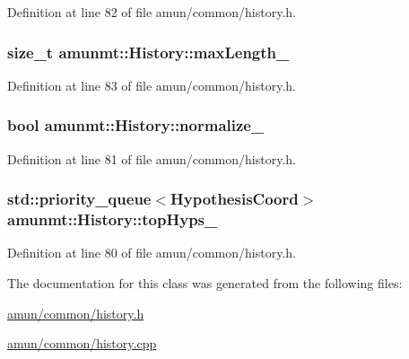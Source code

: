 Definition at line 82 of file amun/common/history.\+h.

\subsubsection[{\texorpdfstring{max\+Length\+\_\+}{maxLength_}}]{\setlength{\rightskip}{0pt plus 5cm}size\+\_\+t amunmt\+::\+History\+::max\+Length\+\_\+\hspace{0.3cm}{\ttfamily [private]}}\hypertarget{classamunmt_1_1History_af78aa04752c1920599f44628311c2eef}{}\label{classamunmt_1_1History_af78aa04752c1920599f44628311c2eef}


Definition at line 83 of file amun/common/history.\+h.

\subsubsection[{\texorpdfstring{normalize\+\_\+}{normalize_}}]{\setlength{\rightskip}{0pt plus 5cm}bool amunmt\+::\+History\+::normalize\+\_\+\hspace{0.3cm}{\ttfamily [private]}}\hypertarget{classamunmt_1_1History_ad43884859a97646dc7f1c8abbf9b50c4}{}\label{classamunmt_1_1History_ad43884859a97646dc7f1c8abbf9b50c4}


Definition at line 81 of file amun/common/history.\+h.

\subsubsection[{\texorpdfstring{top\+Hyps\+\_\+}{topHyps_}}]{\setlength{\rightskip}{0pt plus 5cm}std\+::priority\+\_\+queue$<${\bf Hypothesis\+Coord}$>$ amunmt\+::\+History\+::top\+Hyps\+\_\+\hspace{0.3cm}{\ttfamily [private]}}\hypertarget{classamunmt_1_1History_a592117925905726ff46d3bfa3a55a529}{}\label{classamunmt_1_1History_a592117925905726ff46d3bfa3a55a529}


Definition at line 80 of file amun/common/history.\+h.



The documentation for this class was generated from the following files\+:\begin{DoxyCompactItemize}
\item 
\hyperlink{amun_2common_2history_8h}{amun/common/history.\+h}\item 
\hyperlink{amun_2common_2history_8cpp}{amun/common/history.\+cpp}\end{DoxyCompactItemize}
